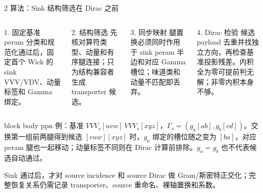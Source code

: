 \documentclass[aspectratio=169,UTF8,fontset=fandol]{ctexbeamer}
\newcommand{\smallnote}[1]{{\scriptsize\color{Muted}#1}}
\begin{document}
\begin{frame}{2 算法：Sink 结构筛选在 Dirac 之前}
\small
\begin{columns}[T,onlytextwidth]
\begin{block}{1. 固定基准}
\scriptsize
peram 分类和规范化通过后，固定首个 Wick 的 sink VVV/VDV、动量标签和 Gamma 绑定。
\end{block}
\begin{block}{2. 结构筛选}
\scriptsize
先核对算符类型、动量和有序腿连接；只为结构兼容者生成 transporter 候选。
\end{block}
\begin{block}{3. 同步映射}
\scriptsize
腿置换必须同时作用于 sink peram 半边和对应 Gamma 槽位；味道类和动量不匹配即丢弃。
\end{block}
\begin{block}{4. Dirac 检验}
\scriptsize
候选 payload 去重并找独立方向，再检查基准投影残差。内积全为零可提前判无解；非零内积本身不够。
\end{block}
\end{columns}
\vspace{0.25em}
\begin{beamercolorbox}[sep=0.45em,wd=\linewidth]{block body}
\scriptsize
ppn 例：基准 \(VVV_s[uvw]\,VVV_s[xyz]\)，\(\Gamma_s=(g_a[ab],g_b[cd])\)。交换第一组前两腿得到候选 \([vuw][xyz]\) 时，\(g_a\) 绑定的槽位随之变为 \([ba]\)，对应 peram 腿也一起移动；动量标签不同则在 Dirac 计算前排除。\(g_a=g_b\) 也不代表候选自动通过。
\end{beamercolorbox}
\vspace{0.1em}
\smallnote{Sink 通过后，才对 source incidence 和 source Dirac 做 Gram/斯密特正交化；完整恢复关系仍需记录 transporter、source 重命名、裸轴置换和系数。}
\end{frame}
\end{document}
